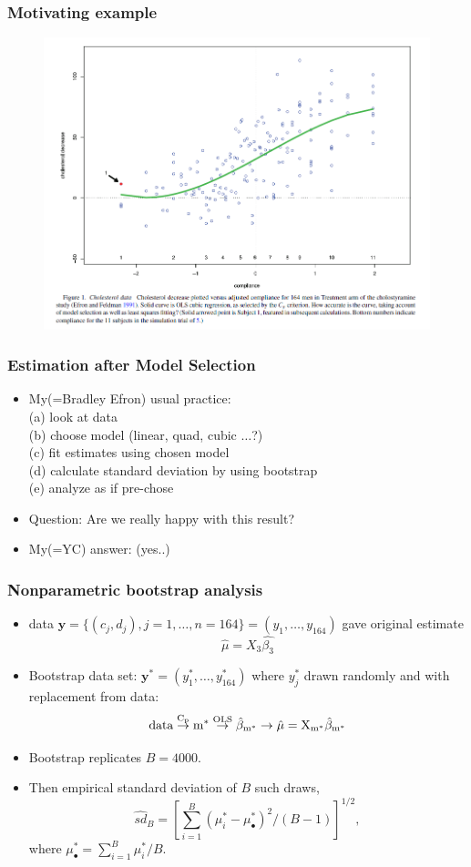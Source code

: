 \documentclass{beamer}
\begin{document}
\begin{frame}
\frametitle{Motivating example}
\begin{figure}[h]
\centering
\includegraphics[width=250bp, height= 210bp]{figure1_e.png}
\end{figure}
\end{frame}
\begin{frame}
\frametitle{Estimation after Model Selection}
\begin{itemize}
\item My(=Bradley Efron) usual practice:\\
(a) look at data\\
(b) choose model (linear, quad, cubic $\dots$?)\\
(c) fit estimates using chosen model\\
(d) calculate standard deviation by using bootstrap\\
(e) analyze as if pre-chose
\item Question: Are we really happy with this result? 
\item My(=YC) answer: (yes..)
\end{itemize}
\end{frame}
\begin{frame}
\frametitle{Nonparametric bootstrap analysis}
\begin{itemize}
\item data $\mathbf{y}=\{(c_j, d_j), j=1,\dots,n=164\}= (y_1 , \dots,y_{164})$ gave original estimate
$$\hat{\mu} = X_3 \hat{\beta_3}$$
\item Bootstrap data set: $\mathbf{y^*}=(y_1 ^*, \dots,y_{164} ^*)$ where $y_j ^*$ drawn randomly and with replacement from data:
$$\rm{data} \overset{C_p} \to  m^* \overset{OLS} \to \hat{\beta}_{m^*}\to \hat{\mu} = X_{m^*} \hat{\beta}_{m^*}$$
\item Bootstrap replicates $B=4000.$
\item Then empirical standard deviation of $B$ such draws,
$$ \hat{sd}_B = \left[  \sum_{i=1} ^B  (\mu_i ^* -\mu_{\bullet} ^*)^2 \Big/ (B-1) \right] ^{1/2},$$
where $\mu_{\bullet} ^* =  \sum_{i=1} ^B \mu_i ^*/B$.
\end{itemize}
\end{frame}
\end{document}
